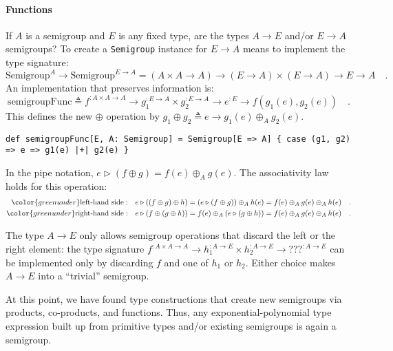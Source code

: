 \paragraph{Functions}

If $A$ is a semigroup and $E$ is any fixed type, are the types $A\rightarrow E$
and/or $E\rightarrow A$ semigroups? To create a \lstinline!Semigroup!
instance for $E\rightarrow A$ means to implement the type signature:
\[
\text{Semigroup}^{A}\rightarrow\text{Semigroup}^{E\rightarrow A}=\left(A\times A\rightarrow A\right)\rightarrow\left(E\rightarrow A\right)\times\left(E\rightarrow A\right)\rightarrow E\rightarrow A\quad.
\]
An implementation that preserves information is:
\[
\text{semigroupFunc}\triangleq f^{:A\times A\rightarrow A}\rightarrow g_{1}^{:E\rightarrow A}\times g_{2}^{:E\rightarrow A}\rightarrow e^{:E}\rightarrow f(g_{1}(e),g_{2}(e))\quad.
\]
This defines the new $\oplus$ operation by $g_{1}\oplus g_{2}\triangleq e\rightarrow g_{1}(e)\oplus_{A}g_{2}(e)$.
\begin{lstlisting}
def semigroupFunc[E, A: Semigroup] = Semigroup[E => A] { case (g1, g2) => e => g1(e) |+| g2(e) }
\end{lstlisting}

In the pipe notation, $e\triangleright(f\oplus g)=f(e)\oplus_{A}g(e)$.
The associativity law holds for this operation:
\begin{align*}
{\color{greenunder}\text{left-hand side}:}\quad & e\triangleright\left(\left(f\oplus g\right)\oplus h\right)=\left(e\triangleright(f\oplus g)\right)\oplus_{A}h(e)=f(e)\oplus_{A}g(e)\oplus_{A}h(e)\quad.\\
{\color{greenunder}\text{right-hand side}:}\quad & e\triangleright\left(f\oplus\left(g\oplus h\right)\right)=f(e)\oplus_{A}\left(e\triangleright(g\oplus h)\right)=f(e)\oplus_{A}g(e)\oplus_{A}h(e)\quad.
\end{align*}

The type $A\rightarrow E$ only allows semigroup operations that discard
the left or the right element: the type signature $f^{:A\times A\rightarrow A}\rightarrow h_{1}^{:A\rightarrow E}\times h_{2}^{:A\rightarrow E}\rightarrow\text{???}^{:A\rightarrow E}$
can be implemented only by discarding $f$ and one of $h_{1}$ or
$h_{2}$. Either choice makes $A\rightarrow E$ into a \textsf{``}trivial\textsf{''}
semigroup.

At this point, we have found type constructions that create new semigroups
via products, co-products, and functions. Thus, any exponential-polynomial
type expression built up from primitive types and/or existing semigroups
is again a semigroup.

